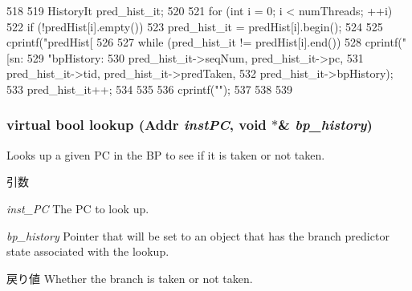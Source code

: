 \begin{DoxyCode}
518 {
519     HistoryIt pred_hist_it;
520 
521     for (int i = 0; i < numThreads; ++i) {
522         if (!predHist[i].empty()) {
523             pred_hist_it = predHist[i].begin();
524 
525             cprintf("predHist[%
526 
527             while (pred_hist_it != predHist[i].end()) {
528                 cprintf("[sn:%
529                         "bpHistory:%
530                         pred_hist_it->seqNum, pred_hist_it->pc,
531                         pred_hist_it->tid, pred_hist_it->predTaken,
532                         pred_hist_it->bpHistory);
533                 pred_hist_it++;
534             }
535 
536             cprintf("\n");
537         }
538     }
539 }
\end{DoxyCode}
\hypertarget{classBPredUnit_a5632fdea0abc34f7d68d8445a7a6c166}{
\subsubsection[{lookup}]{\setlength{\rightskip}{0pt plus 5cm}virtual bool lookup ({\bf Addr} {\em instPC}, \/  void $\ast$\& {\em bp\_\-history})}}
\label{classBPredUnit_a5632fdea0abc34f7d68d8445a7a6c166}
Looks up a given PC in the BP to see if it is taken or not taken. 
\begin{DoxyParams}{引数}
\item[{\em inst\_\-PC}]The PC to look up. \item[{\em bp\_\-history}]Pointer that will be set to an object that has the branch predictor state associated with the lookup. \end{DoxyParams}
\begin{DoxyReturn}{戻り値}
Whether the branch is taken or not taken. 
\end{DoxyReturn}



